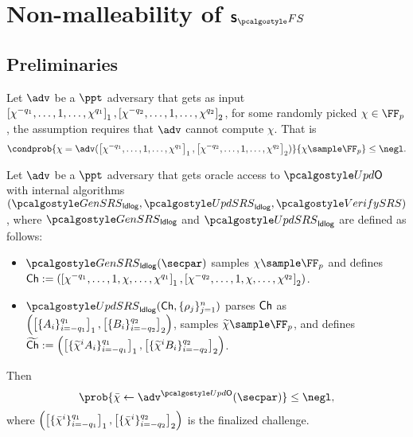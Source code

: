 
\section{Non-malleability of $\sonicprotfs$}
\label{sec:sonic}


\subsection{Preliminaries}
\begin{definition}\label{def:ldlog}
  Let $\adv$ be a $\ppt$ adversary that gets as input
  $\left[\chi^{-q_1}, \ldots, 1, \ldots, \chi^{q_1}\right]_{1}, \left[\chi^{-q_2},
    \ldots, 1, \ldots, \chi^{q_2}\right]_{2}$, for some randomly picked
  $\chi \in \FF_p$, the assumption requires that $\adv$ cannot compute $\chi$. That is
	\[
    \condprob{\chi = \adv(\gone{\chi^{-q_1}, \ldots, 1, \ldots,
        \chi^{q_1}}, \gtwo{\chi^{-q_2}, \ldots, 1, \ldots, \chi^{q_2}
      })}{\chi \sample \FF_p} \leq \negl.
	\]
\end{definition}

\begin{definition}\label{def:uldlog}
	Let $\adv$ be a $\ppt$ adversary that gets oracle access to $\initU$ with internal algorithms $(\kgen_{\ldlog}, \upd_{\ldlog}, \verifyCRS)$, where $\kgen_{\ldlog}$ and $\upd_{\ldlog}$ are defined as follows:
	\begin{itemize}
		\item $\kgen_\ldlog(\secpar)$ samples $\chi \sample \FF_p$ and defines 
		$\mathsf{Ch}:=(\left[\chi^{-q_1}, \ldots, 1, \chi, \ldots,
			\chi^{q_1}\right]_{1}, \left[\chi^{-q_2}, \ldots, 1, \chi, \ldots, \chi^{q_2}
		\right]_{2})$.
		\item $\upd_\ldlog(\Ch, \{\rho_j \}_{j=1}^n)$ 
		parses $\mathsf{Ch}$ as $\left( \left[\{A_i\}_{i = -q_1}^{q_1}\right]_{1},
		\left[\{B_i\}_{i = -q_2}^{q_2}\right]_{2} \right)$, samples
		$\widetilde{\chi} \sample \FF_p$, and defines
		$\widetilde{\mathsf{Ch}} := 
		\left( \left[\{\widetilde{\chi}^i A_i\}_{i = -q_1}^{q_1}\right]_{1},
		\left[\{\widetilde{\chi}^i B_i\}_{i = -q_2}^{q_2}\right]_{2} \right)$.
	\end{itemize}
	Then
	\[
	\prob{\bar{\chi} \gets \adv^{\initU}(\secpar)} \leq \negl,
	\]
	where $\left( \left[\{\bar{\chi}^i\}_{i = -q_1}^{q_1}\right]_{1},
	\left[\{\bar{\chi}^i\}_{i = -q_2}^{q_2}\right]_{2} \right)$ is the finalized challenge.
\end{definition}

